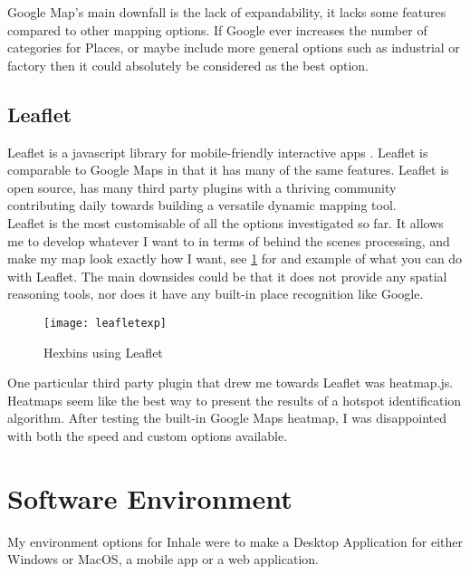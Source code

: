 Google Map's main downfall is the lack of expandability, it lacks some features compared to other mapping options. If Google ever increases the number of categories for Places, or maybe include more general options such as industrial or factory then it could absolutely be considered as the best option.\\

\subsection{Leaflet}

Leaflet is a javascript library for mobile-friendly interactive apps \cite{leaflet}. Leaflet is comparable to Google Maps in that it has many of the same features. Leaflet is open source, has many third party plugins with a thriving community contributing daily towards building a versatile dynamic mapping tool.\\

Leaflet is the most customisable of all the options investigated so far. It allows me to develop whatever I want to in terms of behind the scenes processing, and make my map look exactly how I want, see \ref{fig:leafletexf} for and example of what you can do with Leaflet. The main downsides could be that it does not provide any spatial reasoning tools, nor does it have any built-in place recognition like Google.\\

\begin{figure}[H]
\begin{center}
\texttt{[image: leafletexp]}
\label{fig:leafletexf}
\caption{Hexbins using Leaflet}
\end{center}
\end{figure}

One particular third party plugin that drew me towards Leaflet was heatmap.js. Heatmaps seem like the best way to present the results of a hotspot identification algorithm. After testing the built-in Google Maps heatmap, I was disappointed with both the speed and custom options available.\\

\section{Software Environment}

My environment options for Inhale were to make a Desktop Application for either Windows or MacOS, a mobile app or a web application.\\

